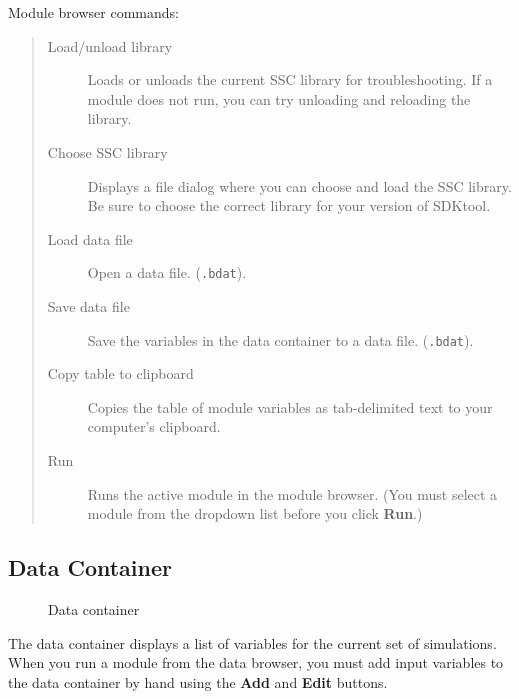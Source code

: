 \documentclass{scrartcl} %
\begin{document}
Module browser commands:
\begin{quote}
\begin{description}
\item[Load/unload library] Loads or unloads the current SSC library for troubleshooting. If a module does not run, you can try unloading and reloading the library.
\item[Choose SSC library] Displays a file dialog where you can choose and load the SSC library. Be sure to choose the correct library for your version of SDKtool.
\item[Load data file] Open a data file. (\texttt{.bdat}).
\item[Save data file] Save the variables in the data container to a data file. (\texttt{.bdat}).
\item[Copy table to clipboard] Copies the table of module variables as tab-delimited text to your computer's clipboard.
\item[Run] Runs the active module in the module browser. (You must select a module from the dropdown list before you click \textbf{Run}.)
\end{description}
\end{quote}

\subsection{Data Container}
\label{sec_data_container}

\begin{figure}
\begin{center}
\end{center}
\caption{Data container}
\label{fig_data_container}
\end{figure}

The data container displays a list of variables for the current set of simulations. When you run a module from the data browser, you must add input variables to the data container by hand using the \textbf{Add} and \textbf{Edit} buttons.
\end{document}
